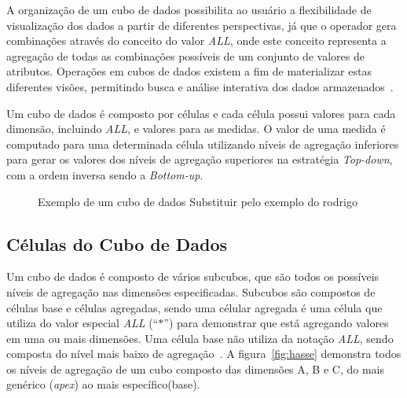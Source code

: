 A organização de um cubo de dados possibilita ao usuário a flexibilidade de visualização dos dados a partir de diferentes perspectivas, já que o operador gera combinações através do conceito do valor \textit{ALL}, onde este conceito representa a agregação de todas as combinações possíveis de um conjunto de valores de atributos.
Operações em cubos de dados existem a fim de materializar estas diferentes visões, permitindo busca e análise interativa dos dados armazenados~\cite{hanDataMiningConcepts2011}.

Um cubo de dados é composto por células e cada célula possui valores para cada dimensão, incluindo \textit{ALL}, e valores para as medidas.
O valor de uma medida é computado para uma determinada célula utilizando níveis de agregação inferiores para gerar os valores dos níveis de agregação superiores na estratégia \textit{Top-down}, com a ordem inversa sendo a \textit{Bottom-up}.

\begin{figure}[!htb]
	\caption{Exemplo de um cubo de dados \color{red}Substituir pelo exemplo do rodrigo}\label{fig:cubeexample}
	\vspace{2mm}
	\begin{center}
	\end{center}
	\vspace{1mm}
	\legenda{}
\end{figure}

\subsection{Células do Cubo de Dados}\label{ch:fun:cube:cells}

Um cubo de dados é composto de vários subcubos, que são todos os possíveis níveis de agregação nas dimensões especificadas.
Subcubos são compostos de células base e células agregadas, sendo uma célular agregada é uma célula que utiliza do valor especial \textit{ALL} (``$*$'') para demonstrar que está agregando valores em uma ou mais dimensões.
Uma célula base não utiliza da notação \textit{ALL}, sendo composta do nível mais baixo de agregação~\cite{limaSEQUENTIALPARALLELAPPROACHES2009}.
A figura~\ref{fig:hasse} demonstra todos os níveis de agregação de um cubo composto das dimensões A, B e C, do mais genérico (\textit{apex}) ao mais específico(base).

